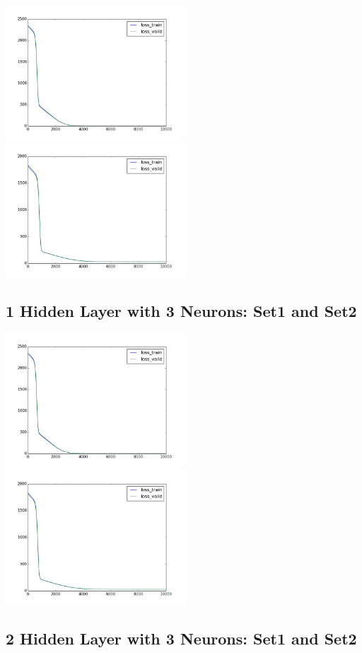 \documentclass[conference]{IEEEtran}
\begin{document}
\includegraphics[width=0.5\textwidth]{set1-[1].png}
\includegraphics[width=0.5\textwidth]{set2-[1].png}


\subsection{1 Hidden Layer with 3 Neurons: Set1 and Set2}

\includegraphics[width=0.5\textwidth]{set1-[3].png}
\includegraphics[width=0.5\textwidth]{set2-[3].png}

\subsection{2 Hidden Layer with 3 Neurons: Set1 and Set2}
\end{document}

